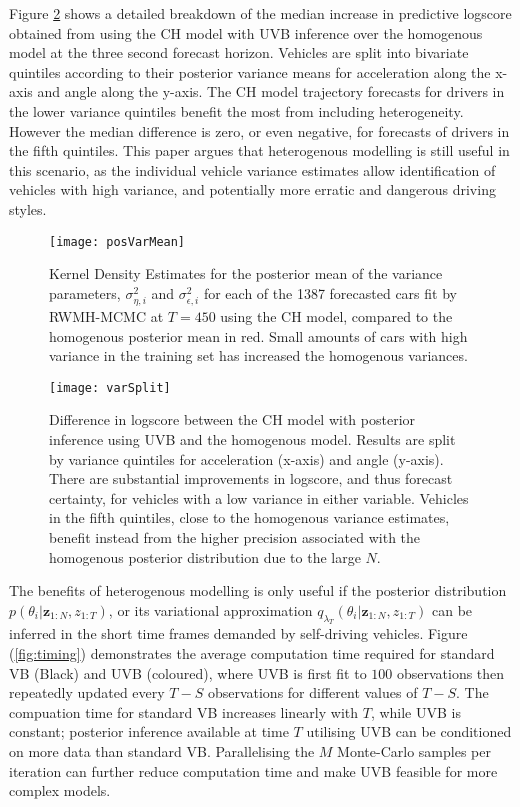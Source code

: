 \documentclass[12pt,a4paper]{article}\usepackage[]{graphicx}\usepackage[]{color}
\begin{document}
{Figure \ref{fig:varSplit} shows a detailed breakdown of the median increase in predictive logscore obtained from using the CH model with UVB inference over the homogenous model at the three second forecast horizon. Vehicles are split into bivariate quintiles according to their posterior variance means for acceleration along the x-axis and angle along the y-axis. The CH model trajectory forecasts for drivers in the lower variance quintiles benefit the most from including heterogeneity. However the median difference is zero, or even negative, for forecasts of drivers in the fifth quintiles. This paper argues that heterogenous modelling is still useful in this scenario, as the individual vehicle variance estimates allow identification of vehicles with high variance, and potentially more erratic and dangerous driving styles.
\\


\begin{figure}[ht]
\centering
\texttt{[image: posVarMean]}
\caption{Kernel Density Estimates for the posterior mean of the variance parameters, $\sigma^2_{\eta, i}$ and $\sigma^2_{\epsilon, i}$ for each of the 1387 forecasted cars fit by RWMH-MCMC at $T = 450$ using the CH model, compared to the homogenous posterior mean in red. Small amounts of cars with high variance in the training set has increased the homogenous variances.}
\label{fig:posVarMean}
\end{figure}

\begin{figure}[ht]
\centering
\texttt{[image: varSplit]}
\caption{Difference in logscore between the CH model with posterior inference using UVB and the homogenous model. Results are split by variance quintiles for acceleration (x-axis) and angle (y-axis). There are substantial improvements in logscore, and thus forecast certainty, for vehicles with a low variance in either variable. Vehicles in the fifth quintiles, close to the homogenous variance estimates, benefit instead from the higher precision associated with the homogenous posterior distribution due to the large $N$.}
\label{fig:varSplit}
\end{figure}

The benefits of heterogenous modelling is only useful if the posterior distribution $p(\theta_{i} | \textbf{z}_{1:N}, z_{1:T})$, or its variational approximation $q_{\lambda_T}(\theta_{i} | \textbf{z}_{1:N}, z_{1:T})$ can be inferred in the short time frames demanded by self-driving vehicles. Figure (\ref{fig:timing}) demonstrates the average computation time required for standard VB (Black) and UVB (coloured), where UVB is first fit to $100$ observations then repeatedly updated every $T-S$ observations for different values of $T-S$. The compuation time for standard VB increases linearly with $T$, while UVB is constant; posterior inference available at time $T$ utilising UVB can be conditioned on more data than standard VB. Parallelising the $M$ Monte-Carlo samples per iteration can further reduce computation time and make UVB feasible for more complex models. 
\\

}
\end{document}
